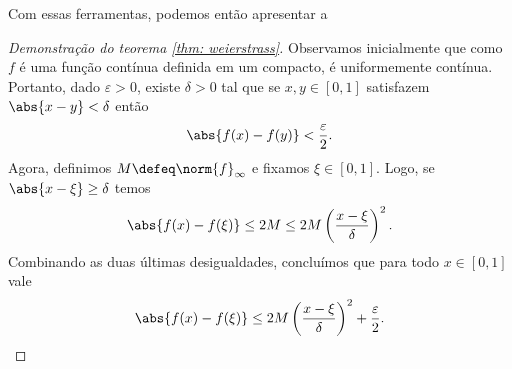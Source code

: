 Com essas ferramentas, podemos então apresentar a
 \begin{proof}[Demonstração do teorema \ref{thm: weierstrass}]
    Observamos inicialmente que como \( f \) é uma função contínua definida em um compacto, é uniformemente contínua.
    Portanto, dado \( \varepsilon > 0 \), existe \( \delta > 0 \) tal que se \( x, y \in [0, 1] \) satisfazem \( \abs{ x - y } < \delta \) então
    \begin{equation}
        \abs{ f(x) - f(y) } < \frac{ \varepsilon }{ 2 }
    .\end{equation}
    Agora, definimos \( M \defeq \norm{ f }_{ \infty } \) e fixamos \( \xi \in [0, 1] \).
    Logo, se \( \abs{ x - \xi } \geq \delta \) temos
    \begin{equation}
        \abs{ f(x) - f(\xi) } \leq 2M \leq 2M \left( \frac{ x - \xi }{ \delta } \right)^2
    .\end{equation}
    Combinando as duas últimas desigualdades, concluímos que para todo \( x \in [0, 1] \) vale
    \begin{equation}
        \abs{ f(x) - f(\xi) } \leq 2M \left( \frac{ x - \xi }{ \delta } \right)^2 + \frac{ \varepsilon }{ 2 }
        \label{eq: weierstrass_bound_1}
    .\end{equation}


\end{proof}
